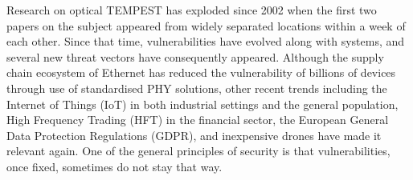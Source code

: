 Research on optical TEMPEST has exploded since 2002 when the first two papers
on the subject appeared from widely separated locations within a week of each
other. Since that time, vulnerabilities have evolved along with systems, and
several new threat vectors have consequently appeared. Although the supply
chain ecosystem of Ethernet has reduced the vulnerability of billions of
devices through use of standardised PHY solutions, other recent trends
including the Internet of Things (IoT) in both industrial settings and the
general population, High Frequency Trading (HFT) in the financial sector, the
European General Data Protection Regulations (GDPR), and inexpensive drones
have made it relevant again. One of the general principles of security is
that vulnerabilities, once fixed, sometimes do not stay that way.
